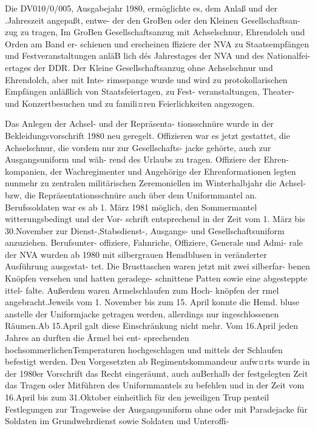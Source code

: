 

Die DV010/0/005, Ausgabejahr 1980, ermöglichte
es, dem Anlaß und der .Jahreszeit angepaßt, entwe-
der den GroBen oder den Kleinen Gesellschaftsan-
zug zu tragen, Im GroBen Gesellschaftsanzug mit
Achselschnur, Ehrendolch und Orden am Band er-
schienen und erscheinen ffiziere der NVA zu
Staatsempfängen und Festveranstaltungen anläB
lich dés Jahrestages der NVA und des Nationalfei-
ertages der DDR. Der Kleine Gesellschaftsanzug
ohne Achselschnur und Ehrendolch, aber mit Inte-
rimsspange wurde und wird zu protokollarischen
Empfängen anläßlich von Staatsfeiertagen, zu Fest-
veranstaltungen, Theater- und Konzertbesuchen
und zu famili¤ren Feierlichkeiten angezogen.

Das Anlegen der Achsel- und der Repräsenta-
tionsschnüre wurde in der Bekleidungsvorschrift
1980 neu geregelt. Offizieren war es jetzt gestattet,
die Achselschnur, die vordem nur zur Gesellschafts-
jacke gehörte, auch zur Ausgangsuniform und wäh-
rend des Urlaubs zu tragen. Offiziere der Ehren-
kompanien, der Wachregimenter und Angehörige
der Ehrenformationen legten nunmehr zu zentralen
militärischen Zeremoniellen im Winterhalbjahr die
Achsel- bzw, die Repräsentationsschnüre auch über
dem Uniformmantel an.
Berufssoldaten war es ab 1. März 1981 möglich,
den Sommermantel witterungsbedingt und der Vor-
schrift entsprechend in der Zeit vom 1. März bis
30.November zur Dienst-,Stabsdienst-, Ausgangs-
und Gesellschaftsuniform anzuziehen. Berufsunter-
offiziere, Fahnriche, Offiziere, Generale und Admi-
rale der NVA wurden ab 1980 mit silbergrauen
Hemdblusen in veränderter Ausführung ausgestat-
tet. Die Brusttaschen waren jetzt mit zwei silberfar-
benen Knöpfen versehen und hatten geradege-
schnittene Patten sowie eine abgesteppte ittel-
falte. Außerdem waren Armelschlaufen zum Hoch-
knöpfen der rmel angebracht.Jeweils vom 1. November bis zum 15. April konnte die Hemd.
bluse anstelle der Uniformjacke getragen werden,
allerdings nur ingeschlossenen Räumen.Ab
15.April galt diese Einschränkung nicht mehr. Vom
16.April jeden Jahres an durften die Ãrmel bei ent-
sprechenden hochsommerlichenTemperaturen
hochgeschlagen und mittels der Schlaufen befestigt
werden.
Den Vorgesetzten ab Regimentskommandeur
aufw¤rts wurde in der 1980er Vorschrift das Recht
eingeräumt, auch auBerhalb der festgelegten Zeit
das Tragen oder Mitführen des Uniformmantels zu
befehlen und in der Zeit vom 16.April bis zum
31.Oktober einheitlich für den jeweiligen Trup
penteil Festlegungen zur Trageweise der Ausgangsuniform ohne oder mit Paradejacke für Soldaten im
Grundwehrdienst sowie Soldaten und Unteroffi-
